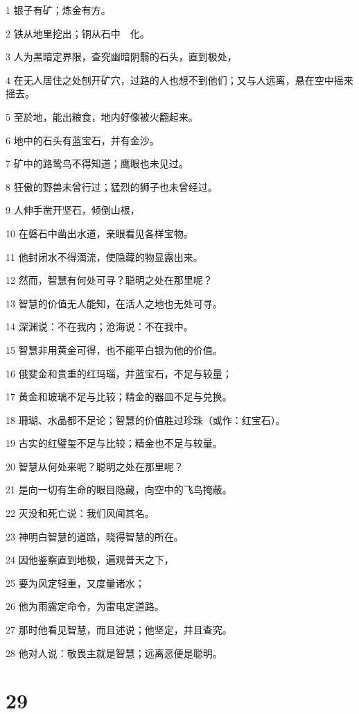 \par 1 银子有矿；炼金有方。
\par 2 铁从地里挖出；铜从石中　化。
\par 3 人为黑暗定界限，查究幽暗阴翳的石头，直到极处，
\par 4 在无人居住之处刨开矿穴，过路的人也想不到他们；又与人远离，悬在空中摇来摇去。
\par 5 至於地，能出粮食，地内好像被火翻起来。
\par 6 地中的石头有蓝宝石，并有金沙。
\par 7 矿中的路鸷鸟不得知道；鹰眼也未见过。
\par 8 狂傲的野兽未曾行过；猛烈的狮子也未曾经过。
\par 9 人伸手凿开坚石，倾倒山根，
\par 10 在磐石中凿出水道，亲眼看见各样宝物。
\par 11 他封闭水不得滴流，使隐藏的物显露出来。
\par 12 然而，智慧有何处可寻？聪明之处在那里呢？
\par 13 智慧的价值无人能知，在活人之地也无处可寻。
\par 14 深渊说：不在我内；沧海说：不在我中。
\par 15 智慧非用黄金可得，也不能平白银为他的价值。
\par 16 俄斐金和贵重的红玛瑙，并蓝宝石，不足与较量；
\par 17 黄金和玻璃不足与比较；精金的器皿不足与兑换。
\par 18 珊瑚、水晶都不足论；智慧的价值胜过珍珠（或作：红宝石）。
\par 19 古实的红璧玺不足与比较；精金也不足与较量。
\par 20 智慧从何处来呢？聪明之处在那里呢？
\par 21 是向一切有生命的眼目隐藏，向空中的飞鸟掩蔽。
\par 22 灭没和死亡说：我们风闻其名。
\par 23 神明白智慧的道路，晓得智慧的所在。
\par 24 因他鉴察直到地极，遍观普天之下，
\par 25 要为风定轻重，又度量诸水；
\par 26 他为雨露定命令，为雷电定道路。
\par 27 那时他看见智慧，而且述说；他坚定，并且查究。
\par 28 他对人说：敬畏主就是智慧；远离恶便是聪明。

\chapter{29}

